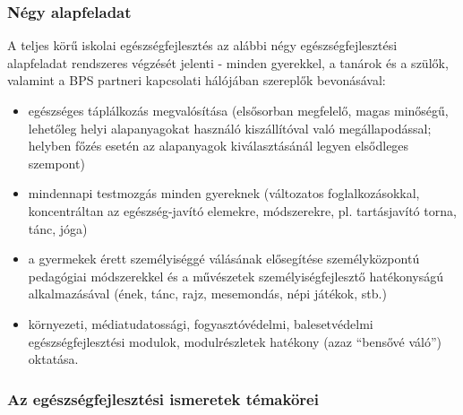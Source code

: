 \subsubsection{Négy alapfeladat}

A teljes körű iskolai egészségfejlesztés az alábbi négy
egészségfejlesztési alapfeladat rendszeres végzését jelenti - minden
gyerekkel, a tanárok és a szülők, valamint a BPS partneri kapcsolati
hálójában szereplők bevonásával:

\begin{itemize}

      \item
            egészséges táplálkozás megvalósítása (elsősorban megfelelő, magas
            minőségű, lehetőleg helyi alapanyagokat használó kiszállítóval való
            megállapodással; helyben főzés esetén az alapanyagok
            kiválasztásánál
            legyen elsődleges szempont)
      \item
            mindennapi testmozgás minden gyereknek (változatos
            foglalkozásokkal,
            koncentráltan az egészség-javító elemekre, módszerekre, pl.
            tartásjavító torna, tánc, jóga)
      \item
            a gyermekek érett személyiséggé válásának elősegítése
            személyközpontú
            pedagógiai módszerekkel és a művészetek személyiségfejlesztő
            hatékonyságú alkalmazásával (ének, tánc, rajz, mesemondás, népi
            játékok, stb.)
      \item
            környezeti, médiatudatossági, fogyasztóvédelmi, balesetvédelmi
            egészségfejlesztési modulok, modulrészletek hatékony (azaz
            ``bensővé
            váló'') oktatása.
\end{itemize}

\subsubsection{Az egészségfejlesztési ismeretek
      témakörei}

